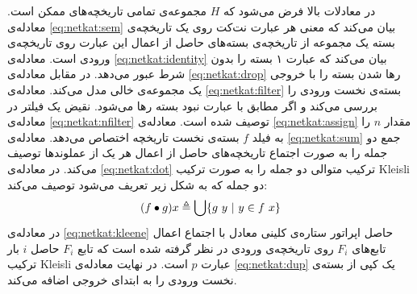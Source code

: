 در معادلات بالا فرض می‌شود که
$H$
مجموعه‌ی تمامی تاریخچه‌های ممکن است.
معادله‌ی
\ref{eq:netkat:sem}
بیان می‌کند که معنی هر عبارت نت‌کت روی یک تاریخچه‌ی بسته یک مجموعه از
تاریخچه‌ی بسته‌های حاصل از اعمال این عبارت روی تاریخچه‌ی ورودی است.
معادله‌ی
\ref{eq:netkat:identity}
بیان می‌کند که عبارت ۱ بسته را بدون شرط عبور می‌دهد.
در مقابل معادله‌ی
\ref{eq:netkat:drop}
رها شدن بسته را با خروجی یک مجموعه‌ی خالی مدل می‌کند.
معادله‌ی
\ref{eq:netkat:filter}
بسته‌ی نخست ورودی را بررسی می‌کند و اگر مطابق با عبارت نبود بسته رها می‌شود.
نقیض یک فیلتر در معادله‌ی
\ref{eq:netkat:nfilter}
توصیف شده است.
معادله‌ی
\ref{eq:netkat:assign}
مقدار
$n$
را به فیلد
$f$
بسته‌ی نخست تاریخچه اختصاص می‌دهد.
معادله‌ی
\ref{eq:netkat:sum}
جمع دو جمله را به صورت اجتماع تاریخچه‌های حاصل از اعمال هر یک از عملوند‌ها توصیف می‌کند.
در معادله‌ی
\ref{eq:netkat:dot}
ترکیب متوالی دو جمله را به صورت ترکیب
Kleisli
دو جمله که به شکل زیر تعریف می‌شود توصیف می‌کند:
\begin{align*}
    (f \bullet g) x \triangleq \bigcup \{g\ y ~|~ y \in f\ x\}
\end{align*}
در معادله‌ی
\ref{eq:netkat:kleene}
حاصل اپراتور ستاره‌ی کلینی
معادل با اجتماع اعمال تابع‌های
$F_i$
روی تاریخچه‌ی ورودی در نظر گرفته شده است که تابع
$F_i$
حاصل
$i$
بار
ترکیب
Kleisli
عبارت
$p$
است.
در نهایت معادله‌ی
\ref{eq:netkat:dup}
یک کپی از بسته‌ی نخست ورودی را به ابتدای خروجی اضافه می‌کند.


